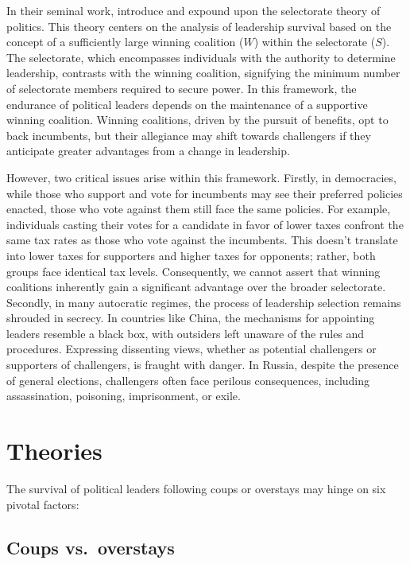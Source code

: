 \documentclass[
  12pt,
  a4paper,
  12pt]{article}
\begin{document}
In their seminal work, \citet{buenodemesquita2003} introduce and expound
upon the selectorate theory of politics. This theory centers on the
analysis of leadership survival based on the concept of a sufficiently
large winning coalition (\(W\)) within the selectorate (\(S\)). The
selectorate, which encompasses individuals with the authority to
determine leadership, contrasts with the winning coalition, signifying
the minimum number of selectorate members required to secure power. In
this framework, the endurance of political leaders depends on the
maintenance of a supportive winning coalition. Winning coalitions,
driven by the pursuit of benefits, opt to back incumbents, but their
allegiance may shift towards challengers if they anticipate greater
advantages from a change in leadership.

However, two critical issues arise within this framework. Firstly, in
democracies, while those who support and vote for incumbents may see
their preferred policies enacted, those who vote against them still face
the same policies. For example, individuals casting their votes for a
candidate in favor of lower taxes confront the same tax rates as those
who vote against the incumbents. This doesn't translate into lower taxes
for supporters and higher taxes for opponents; rather, both groups face
identical tax levels. Consequently, we cannot assert that winning
coalitions inherently gain a significant advantage over the broader
selectorate. Secondly, in many autocratic regimes, the process of
leadership selection remains shrouded in secrecy. In countries like
China, the mechanisms for appointing leaders resemble a black box, with
outsiders left unaware of the rules and procedures. Expressing
dissenting views, whether as potential challengers or supporters of
challengers, is fraught with danger. In Russia, despite the presence of
general elections, challengers often face perilous consequences,
including assassination, poisoning, imprisonment, or exile.

\hypertarget{theories}{%
\section{Theories}\label{theories}}

The survival of political leaders following coups or overstays may hinge
on six pivotal factors:

\hypertarget{coups-vs.-overstays}{%
\subsection{Coups vs.~overstays}\label{coups-vs.-overstays}}
\end{document}

